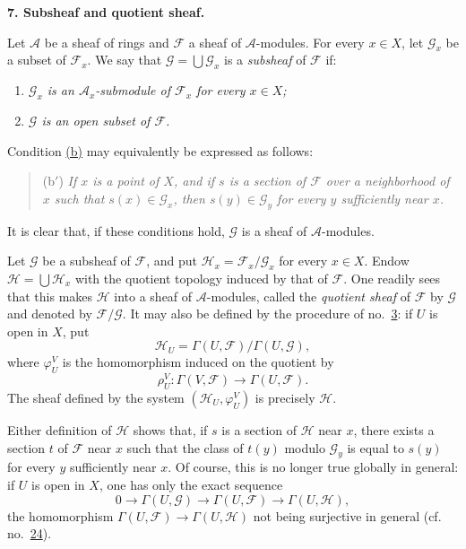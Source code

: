 
\medskip
{}\label{fac:I:1:no:7}
\textbf{7. Subsheaf and quotient sheaf.}

Let $\mathcal{A}$ be a sheaf of rings and $\mathcal{F}$ a sheaf of $\mathcal{A}$-modules. For every $x\in X$, let $\mathcal{G}_x$ be a subset of $\mathcal{F}_x$. We say that $\mathcal{G}=\bigcup\mathcal{G}_x$ is a \textit{subsheaf} of $\mathcal{F}$ if:

\begin{enumerate}[label=(\alph*),leftmargin=2.5em]
\item\label{fac:I:1:no:7:item:a} \textit{$\mathcal{G}_x$ is an $\mathcal{A}_x$-submodule of $\mathcal{F}_x$ for every $x\in X$;}
\item\label{fac:I:1:no:7:item:b} \textit{$\mathcal{G}$ is an open subset of $\mathcal{F}$.}
\end{enumerate}

Condition \hyperref[fac:I:1:no:7:item:b]{(b)} may equivalently be expressed as follows:

\begin{quote}
(b$'$) \textit{If $x$ is a point of $X$, and if $s$ is a section of $\mathcal{F}$ over a neighborhood of $x$ such that $s(x)\in\mathcal{G}_x$, then $s(y)\in\mathcal{G}_y$ for every $y$ sufficiently near $x$.}
\end{quote}

It is clear that, if these conditions hold, $\mathcal{G}$ is a sheaf of $\mathcal{A}$-modules.

Let $\mathcal{G}$ be a subsheaf of $\mathcal{F}$, and put $\mathcal{H}_x=\mathcal{F}_x/\mathcal{G}_x$ for every $x\in X$. Endow $\mathcal{H}=\bigcup\mathcal{H}_x$ with the quotient topology induced by that of $\mathcal{F}$. One readily sees that this makes $\mathcal{H}$ into a sheaf of $\mathcal{A}$-modules, called the \textit{quotient sheaf} of $\mathcal{F}$ by $\mathcal{G}$ and denoted by $\mathcal{F}/\mathcal{G}$. It may also be defined by the procedure of no.~\hyperref[fac:I:1:no:3]{3}: if $U$ is open in $X$, put
\[
  \mathcal{H}_U=\Gamma(U,\mathcal{F})/\Gamma(U,\mathcal{G}),
\]
where $\varphi_U^V$ is the homomorphism induced on the quotient by
\[
  \rho_U^V:\Gamma(V,\mathcal{F})\longrightarrow\Gamma(U,\mathcal{F}).
\]
The sheaf defined by the system $(\mathcal{H}_U,\varphi_U^V)$ is precisely $\mathcal{H}$.

Either definition of $\mathcal{H}$ shows that, if $s$ is a section of $\mathcal{H}$ near $x$, there exists a section $t$ of $\mathcal{F}$ near $x$ such that the class of $t(y)$ modulo $\mathcal{G}_y$ is equal to $s(y)$ for every $y$ sufficiently near $x$. Of course, this is no longer true globally in general: if $U$ is open in $X$, one has only the exact sequence
\[
  0\longrightarrow\Gamma(U,\mathcal{G})
  \longrightarrow\Gamma(U,\mathcal{F})
  \longrightarrow\Gamma(U,\mathcal{H}),
\]
the homomorphism $\Gamma(U,\mathcal{F})\to\Gamma(U,\mathcal{H})$ not being surjective in general (cf. no.~\hyperref[fac:I:3:no:24]{24}).
